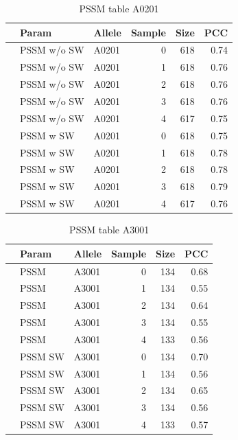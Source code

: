 \begin{table}[ht]
\begin{center}
\begin{tabular}{rllrrr}
  \hline
 & Param & Allele & Sample & Size & PCC \\ 
  \hline
 & PSSM w/o SW & A0201 &   0 & 618 & 0.74 \\ 
 & PSSM w/o SW & A0201 &   1 & 618 & 0.76 \\ 
 & PSSM w/o SW & A0201 &   2 & 618 & 0.76 \\ 
 & PSSM w/o SW & A0201 &   3 & 618 & 0.76 \\ 
 & PSSM w/o SW & A0201 &   4 & 617 & 0.75 \\ 
\hline
 & PSSM w SW & A0201 &   0 & 618 & 0.75 \\ 
 & PSSM w SW & A0201 &   1 & 618 & 0.78 \\ 
 & PSSM w SW & A0201 &   2 & 618 & 0.78 \\ 
 & PSSM w SW & A0201 &   3 & 618 & 0.79 \\ 
 & PSSM w SW & A0201 &   4 & 617 & 0.76 \\ 
   \hline
\end{tabular}
\end{center}
\label{tab:pssm1}
\caption{PSSM table A0201}
\end{table}

\begin{table}[ht]
\begin{center}
\begin{tabular}{rllrrr}
  \hline
 & Param & Allele & Sample & Size & PCC \\ 
  \hline
   & PSSM & A3001 &   0 & 134 & 0.68 \\ 
   & PSSM & A3001 &   1 & 134 & 0.55 \\ 
   & PSSM & A3001 &   2 & 134 & 0.64 \\ 
   & PSSM & A3001 &   3 & 134 & 0.55 \\ 
   & PSSM & A3001 &   4 & 133 & 0.56 \\ 
  \hline
   & PSSM SW & A3001 &   0 & 134 & 0.70 \\ 
   & PSSM SW & A3001 &   1 & 134 & 0.56 \\ 
   & PSSM SW & A3001 &   2 & 134 & 0.65 \\ 
   & PSSM SW & A3001 &   3 & 134 & 0.56 \\ 
   & PSSM SW & A3001 &   4 & 133 & 0.57 \\ 
   \hline
\end{tabular}
\end{center}
\label{tab:pssm2}
\caption{PSSM table A3001}
\end{table}

